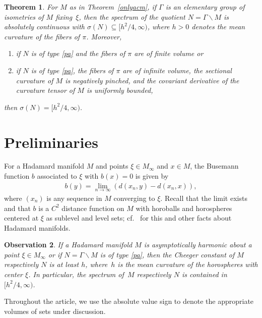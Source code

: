 \documentclass[11pt]{article}
\numberwithin{equation}{section}
\numberwithin{equation}{section}
\newtheorem{Theorem}{Theorem}[section]
\newtheorem{obs}[Theorem]{Observation}
 { \theoremstyle{definition}
\newtheorem{Definition}[Theorem]{Definition}
\newtheorem{Note}[Theorem]{Note}
\newtheorem{Example}[Theorem]{Example}
\newtheorem{Remark}[Theorem]{Remark}
\newtheorem{exas}[Theorem]{Examples}
\newtheorem{exa}[Theorem]{Example}}
\begin{document}
\begin{Theorem}\label{onlyacn}
For $M$ as in Theorem~{\rm \ref{onlyacm}}, if $\Gamma$ is an elementary group of isometries of $M$ fixing~$\xi$,
then the spectrum of the quotient $N=\Gamma\backslash M$ is absolutely continuous
with $\sigma(N)\subseteq\bigl[h^2/4,\infty\bigr)$, where $h>0$ denotes the mean curvature of the fibers of $\pi$.
Moreover,
\begin{enumerate}[label={\rm (\arabic*)}]\itemsep=0pt
\item
if $N$ is of type {\rm \ref{pa}} and the fibers of $\pi$ are of finite volume or
\item
if $N$ is of type {\rm \ref{pa}}, the fibers of $\pi$ are of infinite volume,
the sectional curvature of $M$ is negatively pinched,
and the covariant derivative of the curvature tensor of $M$ is uniformly bounded,
\end{enumerate}
then $\sigma(N)=\bigl[h^2/4,\infty\bigr)$.
\end{Theorem}


\section{Preliminaries}

For a Hadamard manifold $M$ and points $\xi\in M_\infty$ and $x\in M$,
the Busemann function $b$ associated to $\xi$ with $b(x)=0$ is given by
\begin{align*}
	b(y) = \lim_{n\to\infty} (d(x_n,y)-d(x_n,x)),
\end{align*}
where $(x_n)$ is any sequence in $M$ converging to $\xi$.
Recall that the limit exists and that $b$ is a $C^2$ distance function on $M$
with horoballs and horospheres centered at $\xi$ as sublevel and level sets;
cf.~\cite{Ba95} for this and other facts about Hadamard manifolds.

\begin{obs}\label{chee}
If a Hadamard manifold $M$ is asymptotically harmonic about a point $\xi\in M_\infty$
or if $N=\Gamma\backslash M$ is of type {\rm \ref{pa}},
then the Cheeger constant of $M$ respectively $N$ is at least $h$,
where~$h$ is the mean curvature of the horospheres with center $\xi$.
In particular, the spectrum of~$M$ respectively $N$ is contained in $\bigl[h^2/4,\infty\bigr)$.
\end{obs}

Throughout the article,
we use the absolute value sign to denote the appropriate volumes of sets under discussion.
\end{document}
